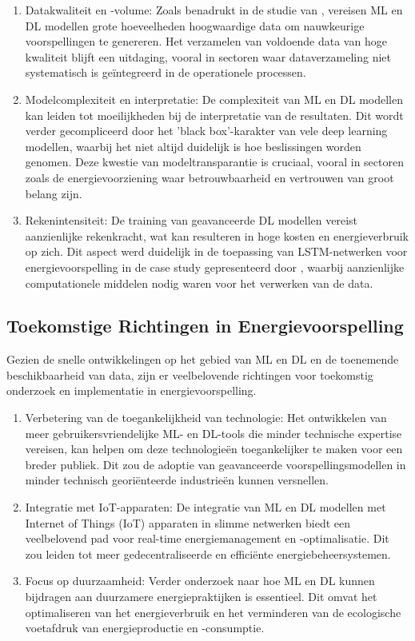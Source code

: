 \begin{enumerate}
    \item Datakwaliteit en -volume: Zoals benadrukt in de studie van \textcite{Alanbar_2020}, vereisen ML en DL modellen grote hoeveelheden hoogwaardige data om nauwkeurige voorspellingen te genereren. Het verzamelen van voldoende data van hoge kwaliteit blijft een uitdaging, vooral in sectoren waar dataverzameling niet systematisch is geïntegreerd in de operationele processen.
    \item Modelcomplexiteit en interpretatie: De complexiteit van ML en DL modellen kan leiden tot moeilijkheden bij de interpretatie van de resultaten. Dit wordt verder gecompliceerd door het 'black box'-karakter van vele deep learning modellen, waarbij het niet altijd duidelijk is hoe beslissingen worden genomen. Deze kwestie van modeltransparantie is cruciaal, vooral in sectoren zoals de energievoorziening waar betrouwbaarheid en vertrouwen van groot belang zijn.
    \item Rekenintensiteit: De training van geavanceerde DL modellen vereist aanzienlijke rekenkracht, wat kan resulteren in hoge kosten en energieverbruik op zich. Dit aspect werd duidelijk in de toepassing van LSTM-netwerken voor energievoorspelling in de case study gepresenteerd door \textcite{Alanbar_2020}, waarbij aanzienlijke computationele middelen nodig waren voor het verwerken van de data.
\end{enumerate}

\subsection{Toekomstige Richtingen in Energievoorspelling}
Gezien de snelle ontwikkelingen op het gebied van ML en DL en de toenemende beschikbaarheid van data, zijn er veelbelovende richtingen voor toekomstig onderzoek en implementatie in energievoorspelling.

\begin{enumerate}
    \item Verbetering van de toegankelijkheid van technologie: Het ontwikkelen van meer gebruikersvriendelijke ML- en DL-tools die minder technische expertise vereisen, kan helpen om deze technologieën toegankelijker te maken voor een breder publiek. Dit zou de adoptie van geavanceerde voorspellingsmodellen in minder technisch georiënteerde industrieën kunnen versnellen.
    \item Integratie met IoT-apparaten: De integratie van ML en DL modellen met Internet of Things (IoT) apparaten in slimme netwerken biedt een veelbelovend pad voor real-time energiemanagement en -optimalisatie. Dit zou leiden tot meer gedecentraliseerde en efficiënte energiebeheersystemen.
    \item Focus op duurzaamheid: Verder onderzoek naar hoe ML en DL kunnen bijdragen aan duurzamere energiepraktijken is essentieel. Dit omvat het optimaliseren van het energieverbruik en het verminderen van de ecologische voetafdruk van energieproductie en -consumptie.
\end{enumerate}

